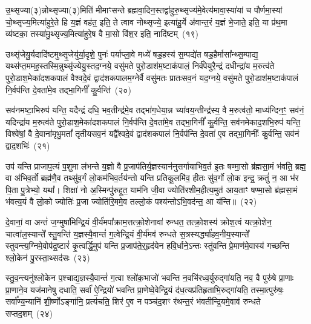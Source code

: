 {\anuvakamend[{उ॒दच॒त्युद्ये\-ऽह॑रा॒प्त्वा पञ्च॑दश च}]}

उ॒थ्सृज्या(३)न्नोथ्सृज्या(३)मिति॑ मीमाꣳसन्ते ब्रह्मवा॒दिन॒स्तद्वा॑हुरु॒थ्सृज्य॑मे॒वेत्य॑मावा॒स्या॑यां च पौर्णमा॒स्यां चो॒थ्सृज्य॒मित्या॑हुरे॒ते हि य॒ज्ञं वह॑त॒ इति॒ ते त्वाव नोथ्सृज्ये॒ इत्या॑हु॒र्ये अ॑वान्त॒रं य॒ज्ञं भे॒जाते॒ इति॒ या प्र॑थ॒मा व्य॑ष्टका॒ तस्या॑मु॒थ्सृज्य॒मित्या॑हुरे॒ष वै मा॒सो वि॑श॒र इति॒ नादि॑ष्टम्~(१९)\ip

उथ्सृ॑जेयु॒र्यदादि॑ष्टमुथ्सृ॒जेयु॑र्या॒दृशे॒ पुनः॑ पर्याप्ला॒वे मध्ये॑ षड॒हस्य॑ स॒म्पद्ये॑त षड॒हैर्मासा᳚न्थ्स॒म्पाद्य॒ यथ्स॑प्त॒ममह॒\-स्तस्मि॒न्नुथ्सृ॑ज्येयु॒स्तद॒ग्नये॒ वसु॑मते पुरो॒डाश॑\-म॒ष्टा\-क॑पालं॒ निर्व॑पेयुरै॒न्द्रं दधीन्द्रा॑य म॒रुत्व॑ते पुरो॒डाश॒मेका॑\-दश\-कपालं वैश्वदे॒वं द्वाद॑श\-कपालम॒ग्नेर्वै वसु॑मतः प्रातःसव॒नं यद॒ग्नये॒ वसु॑मते पुरो॒डाश॑\-म॒ष्टाक॑पालं नि॒र्वप॑न्ति दे॒वता॑मे॒व तद्भा॒गिनीं᳚ कु॒र्वन्ति॑~(२०)\ip

सव॑नमष्टा॒भिरुप॑ यन्ति॒ यदैन्द्रं दधि॒ भव॒तीन्द्र॑मे॒व तद्भा॑ग॒धेया॒न्न च्या॑वय॒न्तीन्द्र॑स्य॒ वै म॒रुत्व॑तो॒ माध्य॑न्दिन॒ꣳ॒ सव॑नं॒ यदिन्द्रा॑य म॒रुत्व॑ते पुरो॒डाश॒मेका॑\-दश\-कपालं नि॒र्वप॑न्ति दे॒वता॑मे॒व तद्भा॒गिनीं᳚ कु॒र्वन्ति॒ सव॑नमेकाद॒शभि॒रुप॑ यन्ति॒ विश्वे॑षां॒ वै दे॒वाना॑मृभु॒मतां᳚ तृतीय\-सव॒नं यद्वै᳚श्वदे॒वं द्वाद॑श\-कपालं नि॒र्वप॑न्ति दे॒वता॑ ए॒व तद्भा॒गिनीः᳚ कु॒र्वन्ति॒ सव॑नं द्वाद॒शभिः॑~(२१)\ip

उप॑ यन्ति प्राजाप॒त्यं प॒शुमा ल॑भन्ते य॒ज्ञो वै प्र॒जा\-प॑तिर्य॒ज्ञस्यान॑नुसर्गायाभिव॒र्त इ॒तः षण्मा॒सो ब्र॑ह्मसा॒मं भ॑वति॒ ब्रह्म॒ वा अ॑भिव॒र्तो ब्रह्म॑णै॒व तथ्सु॑व॒र्गं लो॒कम॑भिव॒र्तय॑न्तो यन्ति प्रतिकू॒लमि॑व॒ हीतः सु॑व॒र्गो लो॒क इन्द्र॒ क्रतुं॑ न॒ आ भ॑र पि॒ता पु॒त्रेभ्यो॒ यथा᳚। शिक्षा॑ नो अ॒स्मिन्पु॑रुहूत॒ याम॑नि जी॒वा ज्योति॑रशीम॒हीत्य॒मुत॑ आय॒ताꣳ षण्मा॒सो ब्र॑ह्मसा॒मं भ॑वत्य॒यं वै लो॒को ज्योतिः॑ प्र॒जा ज्योति॑रि॒ममे॒व तल्लो॒कं पश्य॑न्तो\-ऽभि॒वद॑न्त॒ आ य॑न्ति॥~(२२)\ip

{\anuvakamend[{नादि॑ष्टङ्कु॒र्वन्ति॑ द्वाद॒शभि॒रिति॑ विꣳश॒तिश्च॑}]}

दे॒वानां॒ वा अन्तं॑ ज॒ग्मुषा॑मिन्द्रि॒यं वी॒र्य॑मपा᳚क्राम॒त्तत्क्रो॒शेनावा॑ रुन्धत॒ तत्क्रो॒शस्य॑ क्रोश॒त्वं यत्क्रो॒शेन॒ चात्वा॑ल॒स्यान्ते᳚ स्तु॒वन्ति॑ य॒ज्ञस्यै॒वान्तं॑ ग॒त्वेन्द्रि॒यं वी॒र्य॑मव॑ रुन्धते स॒त्रस्यर्द्ध्या॑हव॒नीय॒स्यान्ते᳚ स्तुवन्त्य॒ग्निमे॒वोप॑द्र॒ष्टारं॑ कृ॒त्वर्द्धि॒मुप॑ यन्ति प्र॒जा\-प॑ते॒र्॒\mbox{}हृद॑येन हवि॒र्धाने॒\-ऽन्तः स्तु॑वन्ति प्रे॒माण॑मे॒वास्य॑ गच्छन्ति श्लो॒केन॑ पु॒रस्ता॒थ्सद॑सः~(२३)\ip

स्तु॒व॒न्त्यनु॑श्लोकेन प॒श्चाद्य॒ज्ञस्यै॒वान्तं॑ ग॒त्वा श्लो॑क॒भाजो॑ भवन्ति न॒वभि॑रध्व॒र्युरुद्गा॑यति॒ नव॒ वै पुरु॑षे प्रा॒णाः प्रा॒णाने॒व यज॑मानेषु दधाति॒ सर्वा॑ ऐ॒न्द्रियो॑ भवन्ति प्रा॒णेष्वे॒वेन्द्रि॒यं द॑ध॒त्यप्र॑तिहृताभि॒रुद्गा॑यति॒ तस्मा॒त्पुरु॑षः॒ सर्वा᳚ण्य॒न्यानि॑ शी॒र्ष्णो\-ऽङ्गा॑नि॒ प्रत्य॑चति॒ शिर॑ ए॒व न पञ्च॑द॒शꣳ र॑थन्त॒रं भ॑वतीन्द्रि॒यमे॒वाव॑ रुन्धते सप्तद॒शम्~(२४)\ip

